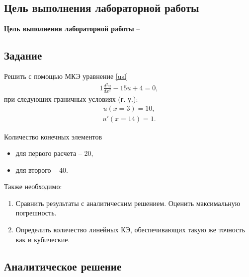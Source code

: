 \subsection{Цель выполнения лабораторной работы}\label{blockN.VariantM}
\textbf{Цель выполнения лабораторной работы }-- \GoalOfResearch

\subsection{Задание}

Решить с помощью МКЭ уравнение \ref{usl}
\begin{align}\label{usl}
1\frac{d^2u}{dx^2}    -15   u  + 4 
=0,
\end{align}
при следующих граничных условиях (г. у.): 
\begin{align}\label{2_rod}
    u(x=3) = 10,
\end{align}
\begin{align}\label{1_rod}
    u'(x=14) = 1.
\end{align}

Количество конечных элементов
\begin{itemize}
    \item для первого расчета -- 20,
    \item для второго -- 40.
\end{itemize}

Также необходимо:
\begin{enumerate}
    \item Сравнить результаты с аналитическим решением. Оценить максимальную погрешность.
    \item Определить количество линейных КЭ, обеспечивающих такую же точность как и кубические.
\end{enumerate}

\newpage
\subsection{Аналитическое решение}

